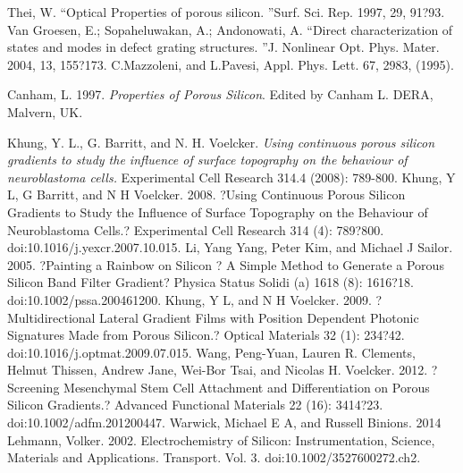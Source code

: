 \documentclass[a4paper,11pt,]{book}
\begin{document}
{\begin{thebibliography}{X}
 Thei, W. \textquotedblleft Optical Properties of porous silicon. \textquotedblright Surf. Sci. Rep. 1997, 29, 91?93. 
 Van Groesen, E.; Sopaheluwakan, A.; Andonowati, A. \textquotedblleft  Direct characterization of states and modes in defect grating structures. \textquotedblright J. Nonlinear Opt. Phys. Mater. 2004, 13, 155?173. 
{} C.Mazzoleni, and L.Pavesi, Appl. Phys. Lett. 67, 2983, (1995).

Canham, L. 1997. \emph{Properties of Porous Silicon}. Edited by Canham L. DERA, Malvern, UK.


Khung, Y. L., G. Barritt, and N. H. Voelcker. \emph{Using continuous porous silicon gradients to study the influence of surface topography on the behaviour of neuroblastoma cells.} Experimental Cell Research 314.4 (2008): 789-800.
Khung, Y L, G Barritt, and N H Voelcker. 2008. ?Using Continuous Porous Silicon Gradients to Study the Influence of Surface Topography on the Behaviour of Neuroblastoma Cells.? Experimental Cell Research 314 (4): 789?800. doi:10.1016/j.yexcr.2007.10.015.
Li, Yang Yang, Peter Kim, and Michael J Sailor. 2005. ?Painting a Rainbow on Silicon ? A Simple Method to Generate a Porous Silicon Band Filter Gradient? Physica Status Solidi (a) 1618 (8): 1616?18. doi:10.1002/pssa.200461200.
Khung, Y L, and N H Voelcker. 2009. ?Multidirectional Lateral Gradient Films with Position Dependent Photonic Signatures Made from Porous Silicon.? Optical Materials 32 (1): 234?42. doi:10.1016/j.optmat.2009.07.015. 
 Wang,  Peng-Yuan,  Lauren  R.  Clements,  Helmut  Thissen,  Andrew  Jane, Wei-Bor  Tsai,  and Nicolas  H.  Voelcker.  2012.   ?Screening   Mesenchymal  Stem  Cell  Attachment  and Differentiation  on  Porous Silicon Gradients.?  Advanced  Functional Materials  22 (16): 3414?23. doi:10.1002/adfm.201200447. Warwick, Michael E A, and Russell Binions. 2014
Lehmann, Volker. 2002. Electrochemistry of Silicon: Instrumentation, Science, Materials and
Applications. Transport. Vol. 3. doi:10.1002/3527600272.ch2.



\end{thebibliography}}
\end{document}
